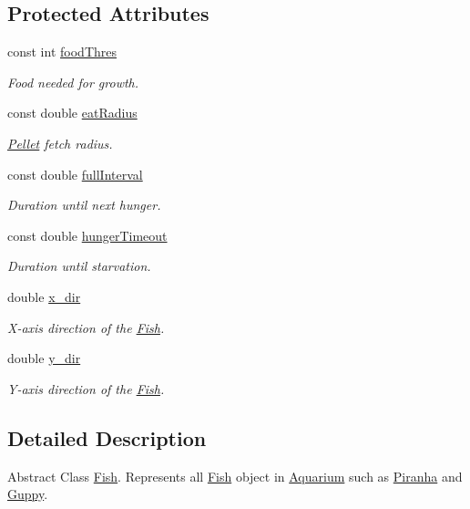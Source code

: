 \subsection*{Protected Attributes}
\begin{DoxyCompactItemize}
\item 
const int \mbox{\hyperlink{class_fish_aea009e0f3f93e7a728294e30f1f350ed}{food\+Thres}}
\begin{DoxyCompactList}\small\item\em Food needed for growth. \end{DoxyCompactList}\item 
const double \mbox{\hyperlink{class_fish_a51d4f0f3965f1547344559f861b907f6}{eat\+Radius}}
\begin{DoxyCompactList}\small\item\em \mbox{\hyperlink{class_pellet}{Pellet}} fetch radius. \end{DoxyCompactList}\item 
const double \mbox{\hyperlink{class_fish_a1a98bca18c072e53bfcb27203aac5665}{full\+Interval}}
\begin{DoxyCompactList}\small\item\em Duration until next hunger. \end{DoxyCompactList}\item 
const double \mbox{\hyperlink{class_fish_aa8090ae6de19904c27d039fc28691da7}{hunger\+Timeout}}
\begin{DoxyCompactList}\small\item\em Duration until starvation. \end{DoxyCompactList}\item 
double \mbox{\hyperlink{class_fish_af2d14945a447d890696f16ac60a43b4a}{x\+\_\+dir}}
\begin{DoxyCompactList}\small\item\em X-\/axis direction of the \mbox{\hyperlink{class_fish}{Fish}}. \end{DoxyCompactList}\item 
double \mbox{\hyperlink{class_fish_a5e9e0091482ec1bdf758fd5947564ac7}{y\+\_\+dir}}
\begin{DoxyCompactList}\small\item\em Y-\/axis direction of the \mbox{\hyperlink{class_fish}{Fish}}. \end{DoxyCompactList}\end{DoxyCompactItemize}


\subsection{Detailed Description}
Abstract Class \mbox{\hyperlink{class_fish}{Fish}}. Represents all \mbox{\hyperlink{class_fish}{Fish}} object in \mbox{\hyperlink{class_aquarium}{Aquarium}} such as \mbox{\hyperlink{class_piranha}{Piranha}} and \mbox{\hyperlink{class_guppy}{Guppy}}. 

